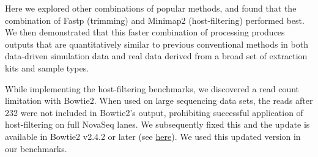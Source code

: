 Here we explored other combinations of popular methods, and found that the combination of Fastp \cite{Chen2018-zx} (trimming) and Minimap2 \cite{Li2018-bw} (host-filtering) performed best. We then demonstrated that this faster combination of processing produces outputs that are quantitatively similar to previous conventional methods in both data-driven simulation data and real data derived from a broad set of extraction kits and sample types.

While implementing the host-filtering benchmarks, we discovered a read count limitation with Bowtie2. When used on large sequencing data sets, the reads after 232 were not included in Bowtie2's output, prohibiting successful application of host-filtering on full NovaSeq lanes. We subsequently fixed this and the update is available in Bowtie2 v2.4.2 or later (see \href{https://github.com/BenLangmead/bowtie2/pull/312}{here}). We used this updated version in our benchmarks.

